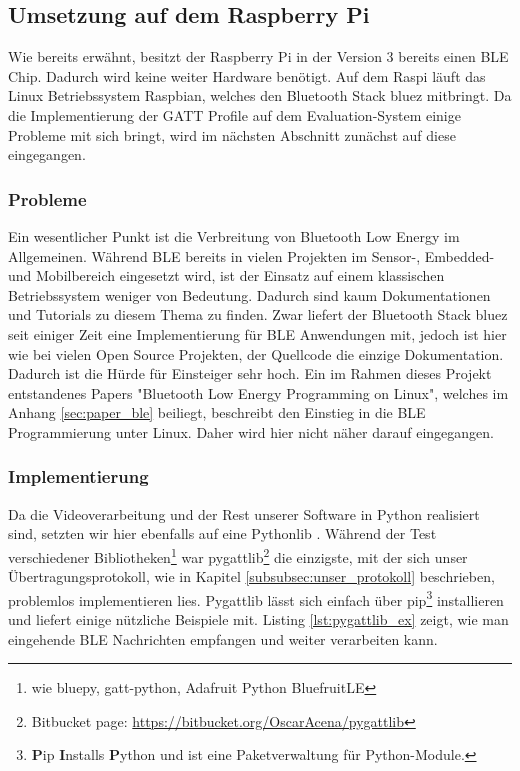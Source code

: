 \subsection{Umsetzung auf dem Raspberry Pi}
\label{subsubsec:ble_raspi}
Wie bereits erwähnt, besitzt der Raspberry Pi in der Version 3 bereits einen BLE Chip. Dadurch wird keine weiter Hardware benötigt. Auf dem Raspi läuft das Linux Betriebssystem Raspbian, welches den Bluetooth Stack \glqq{}bluez\grqq{} mitbringt. Da die Implementierung der GATT Profile auf dem Evaluation-System einige Probleme mit sich bringt, wird im nächsten Abschnitt zunächst auf diese eingegangen.

\subsubsection{Probleme}
Ein wesentlicher Punkt ist die Verbreitung von Bluetooth Low Energy im Allgemeinen. Während BLE bereits in vielen Projekten im Sensor-, Embedded- und Mobilbereich eingesetzt wird, ist der Einsatz auf einem klassischen Betriebssystem weniger von Bedeutung. Dadurch sind kaum Dokumentationen und Tutorials zu diesem Thema zu finden. Zwar liefert der Bluetooth Stack \glqq{}bluez\grqq{} seit einiger Zeit eine Implementierung für BLE Anwendungen mit, jedoch ist hier wie bei vielen Open Source Projekten, der Quellcode die einzige Dokumentation. Dadurch ist die Hürde für Einsteiger sehr hoch. Ein im Rahmen dieses Projekt entstandenes Papers "Bluetooth Low Energy Programming on Linux", welches im Anhang \ref{sec:paper_ble} beiliegt, beschreibt den Einstieg in die BLE Programmierung unter Linux. Daher wird hier nicht näher darauf eingegangen. 

\subsubsection{Implementierung}
Da die Videoverarbeitung und der Rest unserer Software in Python realisiert sind, setzten wir hier ebenfalls auf eine Pythonlib . Während der Test verschiedener Bibliotheken\footnote{wie bluepy, gatt-python, Adafruit Python BluefruitLE} war pygattlib\footnote{Bitbucket page: \url{https://bitbucket.org/OscarAcena/pygattlib}} die einzigste, mit der sich unser Übertragungsprotokoll, wie in Kapitel \ref{subsubsec:unser_protokoll} beschrieben, problemlos implementieren lies. Pygattlib lässt sich einfach über pip\footnote{ \textbf{P}ip \textbf{I}nstalls \textbf{P}ython und ist eine Paketverwaltung für Python-Module. } installieren und liefert einige nützliche Beispiele mit. Listing \ref{lst:pygattlib_ex} zeigt, wie man eingehende BLE Nachrichten empfangen und weiter verarbeiten kann. 


